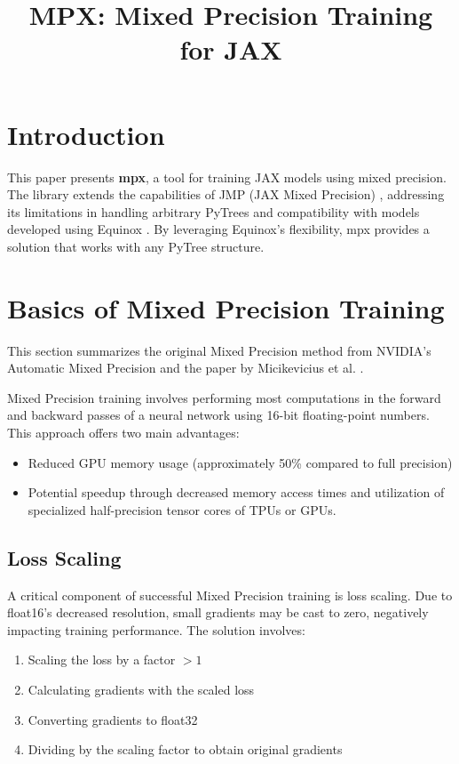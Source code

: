 \documentclass[11pt,a4paper]{article}
\title{MPX: Mixed Precision Training for JAX}
\author{}
\date{}
\begin{document}
\maketitle

\section{Introduction}
This paper presents \textbf{mpx}, a tool for training JAX models using mixed precision. The library extends the capabilities of JMP (JAX Mixed Precision) \cite{jmp}, addressing its limitations in handling arbitrary PyTrees and compatibility with models developed using Equinox \cite{equinox}. By leveraging Equinox's flexibility, mpx provides a solution that works with any PyTree structure.

\section{Basics of Mixed Precision Training}
This section summarizes the original Mixed Precision method from NVIDIA's Automatic Mixed Precision \cite{nvidia_amp} and the paper by Micikevicius et al. \cite{mixed_precision_paper}.

Mixed Precision training involves performing most computations in the forward and backward passes of a neural network using 16-bit floating-point numbers. This approach offers two main advantages:
\begin{itemize}
    \item Reduced GPU memory usage (approximately 50\% compared to full precision)
    \item Potential speedup through decreased memory access times and utilization of specialized half-precision tensor cores of TPUs or GPUs.
\end{itemize}

\subsection{Loss Scaling}
A critical component of successful Mixed Precision training is loss scaling. Due to float16's decreased resolution, small gradients may be cast to zero, negatively impacting training performance. The solution involves:
\begin{enumerate}
    \item Scaling the loss by a factor $> 1$
    \item Calculating gradients with the scaled loss
    \item Converting gradients to float32
    \item Dividing by the scaling factor to obtain original gradients
\end{enumerate}
\end{document}
